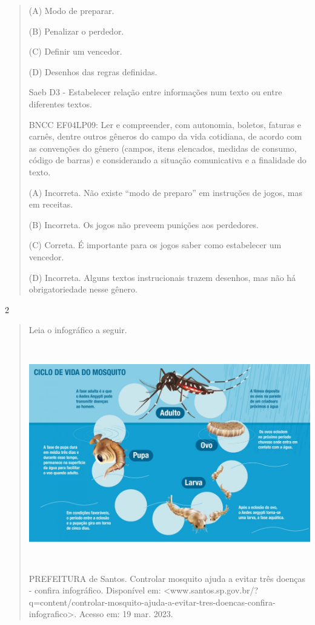 \begin{escolha}
\begin{escolha}
{\begin{quote}
(A) Modo de preparar.

(B) Penalizar o perdedor.

(C) Definir um vencedor.

(D) Desenhos das regras definidas.

Saeb D3 - Estabelecer relação entre informações num texto ou entre
diferentes textos.

BNCC EF04LP09: Ler e compreender, com autonomia, boletos, faturas e
carnês, dentre outros gêneros do campo da vida cotidiana, de acordo com
as convenções do gênero (campos, itens elencados, medidas de consumo,
código de barras) e considerando a situação comunicativa e a finalidade
do texto.

(A) Incorreta. Não existe ``modo de preparo'' em instruções de jogos,
mas em receitas.

(B) Incorreta. Os jogos não preveem punições aos perdedores.

(C) Correta. É importante para os jogos saber como estabelecer um
vencedor.

(D) Incorreta. Alguns textos instrucionais trazem desenhos, mas não há
obrigatoriedade nesse gênero.
\end{quote}

\num{2}

\begin{quote}
Leia o infográfico a seguir.

\includegraphics[width=5.90556in,height=3.72118in]{media/image37.jpeg}

PREFEITURA de Santos. Controlar mosquito ajuda a evitar três doenças -
confira infográfico. Disponível em:
\textless{}www.santos.sp.gov.br/?q=content/controlar-mosquito-ajuda-a-evitar-tres-doencas-confira-infografico\textgreater{}.
Acesso em: 19 mar. 2023.


\end{quote}}
\end{escolha}
\end{escolha}
